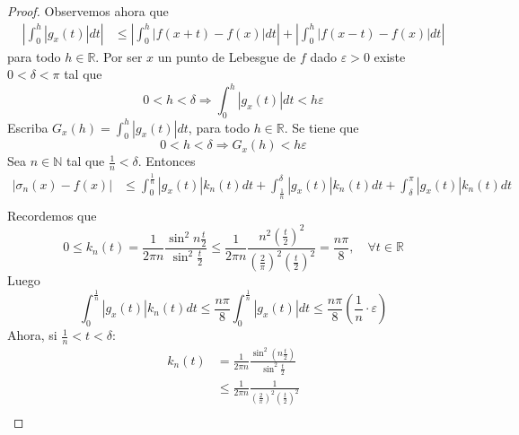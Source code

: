 \documentclass[12pt]{report}
\theoremstyle{largebreak}
\renewcommand{\leq}{\ensuremath{\leqslant}}
\newcommand\abs[1]{\ensuremath{\left|#1\right|}}
\begin{document}
\begin{proof}
        Observemos ahora que
        \begin{equation*}
            \begin{split}
                \abs{\int_0^{h}\abs{g_x(t)}dt}&\leq\abs{\int_0^h\abs{f(x+t)-f(x)}dt}+\abs{\int_0^h\abs{f(x-t)-f(x)}dt}
            \end{split}
        \end{equation*}
        para todo $h\in\mathbb{R}$. Por ser $x$ un punto de Lebesgue de $f$ dado $\varepsilon>0$ existe $0<\delta<\pi$ tal que
        \begin{equation*}
            0<h<\delta\Rightarrow\int_0^{h}\abs{g_x(t)}dt<h\varepsilon
        \end{equation*}
        Escriba $G_x(h)=\int_0^h \abs{g_x(t)}dt$, para todo $h\in\mathbb{R}$. Se tiene que
        \begin{equation*}
            0<h<\delta\Rightarrow G_x(h)<h\varepsilon
        \end{equation*}
        Sea $n\in\mathbb{N}$ tal que $\frac{1}{n}<\delta$. Entonces
        \begin{equation*}
            \begin{split}
                \abs{\sigma_n(x)-f(x)}&\leq\int_0^{\frac{1}{n}}\abs{g_x(t)}k_n(t)dt+\int_{\frac{1}{n}}^\delta\abs{g_x(t)}k_n(t)dt+\int_\delta^{\pi}\abs{g_x(t)}k_n(t)dt\\
            \end{split}
        \end{equation*}
        Recordemos que
        \begin{equation*}
            0\leq k_n(t)=\frac{1}{2\pi n}\frac{\sin^2 n\frac{t}{2}}{\sin^2\frac{t}{2}}\leq\frac{1}{2\pi n}\frac{n^2\left( \frac{t}{2}\right)^2}{\left(\frac{2}{\pi} \right)^2\left(\frac{t}{2} \right)^2}=\frac{n\pi}{8},\quad\forall t\in\mathbb{R}
        \end{equation*}
        Luego
        \begin{equation*}
            \int_0^{\frac{1}{n}}\abs{g_x(t)}k_n(t)dt\leq\frac{n\pi}{8}\int_0^{\frac{1}{n}}\abs{g_x(t)}dt\leq\frac{n\pi}{8}\left(\frac{1}{n}\cdot\varepsilon \right)
        \end{equation*}
        Ahora, si $\frac{1}{n}<t<\delta$:
        \begin{equation*}
            \begin{split}
                k_n(t)&=\frac{1}{2\pi n}\frac{\sin^2\left(n\frac{t}{2} \right)}{\sin^2\frac{t}{2}}\\
                &\leq\frac{1}{2\pi n}\frac{1}{\left(\frac{2}{\pi} \right)^2 \left(\frac{t}{2} \right)^2}\\

\end{split}
\end{equation*}
\end{proof}
\end{document}
